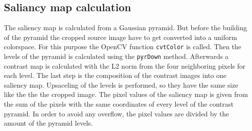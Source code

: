\documentclass[draft,final]{vutinfth} %
\begin{document}
\subsection{Saliancy map calculation}
The saliency map is calculated from a Gaussian pyramid.
But before the building of the pyramid the cropped source image have to get converted into a uniform colorspace.
For this purpose the OpenCV function \texttt{cvtColor} is called.
Then the levels of the pyramid is calculated using the \texttt{pyrDown} method.
Afterwards a contrast map is calculated with the L2 norm from the four neighboring pixels for each level.
The last step is the composition of the contrast images into one saliency map.
Upsaceling of the levels is performed, so they have the same size like the the the cropped image.
The pixel values of the saliency map is given from the sum of the pixels with the same coordinates of every level of the contrast pyramid. 
In order to avoid any overflow, the pixel values are divided by the amount of the pyramid levels.
\end{document}
